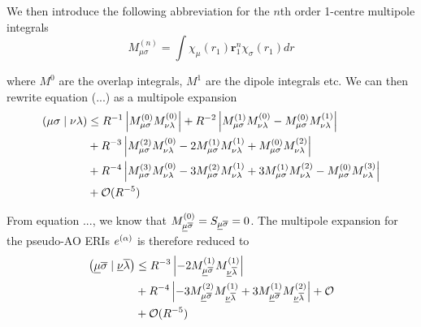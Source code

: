 \noindent We then introduce the following abbreviation for the $n$th order 1-centre multipole integrals
\begin{equation}
M^{(n)}_{\mu\sigma} = \int \chi_{\mu}(r_1) \mathbf{r}_1^n \chi_{\sigma}(r_1) dr
\end{equation}

\noindent where $M^{0}$ are the overlap integrals, $M^{1}$ are the dipole integrals etc. We can then rewrite equation (...) as a multipole expansion
\newcommand{\mpole}[2]{M_{#1}^{(#2)}}
\begin{equation}
\begin{split}
\cn{\mu\sigma}{\nu\lambda} &\leq R^{-1} \left\lvert \mpole{\mu\sigma}{0} \mpole{\nu\lambda}{0} \right\rvert + R^{-2} \left\lvert \mpole{\mu\sigma}{1} \mpole{\nu\lambda}{0} - \mpole{\mu\sigma}{0} \mpole{\nu\lambda}{1} \right\rvert \\
&+ R^{-3} \left\lvert \mpole{\mu\sigma}{2} \mpole{\nu\lambda}{0} - 2 \mpole{\mu\sigma}{1} \mpole{\nu\lambda}{1} + \mpole{\mu\sigma}{0} \mpole{\nu\lambda}{2}\right\rvert \\
&+ R^{-4} \left\lvert \mpole{\mu\sigma}{3} \mpole{\nu\lambda}{0} - 3\mpole{\mu\sigma}{2} \mpole{\nu\lambda}{1} + 3\mpole{\mu\sigma}{1} \mpole{\nu\lambda}{2} - \mpole{\mu\sigma}{0} \mpole{\nu\lambda}{3}\right\rvert \\
&+ \mathcal{O}(R^{-5})
\end{split}
\end{equation}

From equation ..., we know that $M_{\underline{\mu}\overline{\sigma}}^{(0)} = S_{\underline{\mu}\overline{\sigma}} = 0$. The multipole expansion for the pseudo-AO ERIs $e^{(\alpha)}$ is therefore reduced to
\begin{equation}
\begin{split}
\cn{\ulgm\olgs}{\ulgn\olgl} &\leq R^{-3} \left\lvert - 2 \mpole{\ulgm\olgs}{1} \mpole{\ulgn\olgl}{1} \right\rvert \\
&+ R^{-4} \left\lvert - 3\mpole{\ulgm\olgs}{2} \mpole{\ulgn\olgl}{1} + 3\mpole{\ulgm\olgs}{1} \mpole{\ulgn\olgl}{2} \right\rvert + \mathcal{O} \\
&+ \mathcal{O}(R^{-5})
\end{split}
\end{equation}

